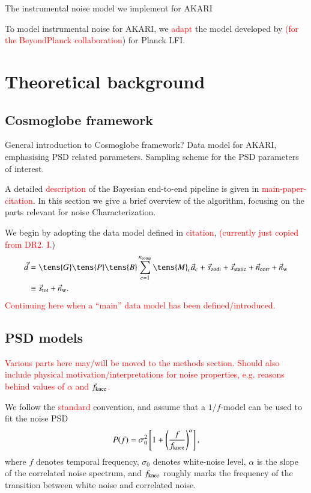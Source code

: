 \documentclass{aa}
\newcommand{\dv}[0]{\vec{d}}
\newcommand{\B}[0]{\tens{B}}
\newcommand{\G}[0]{\tens{G}}
\newcommand{\n}[0]{\vec{n}}
\newcommand{\s}[0]{\vec{s}}
\renewcommand{\a}[0]{\vec{a}}
\newcommand{\M}[0]{\tens{M}}
\renewcommand{\P}[0]{\tens{P}}
\renewcommand{\note}[1]{\textcolor{red}{#1}}
\newcommand{\pnote}[1]{\textcolor{red}{(#1})}
\newcommand{\pclosed}[1]{\left(#1\right)}
\newcommand{\bclosed}[1]{\left[#1\right]}
\begin{document}
The instrumental noise model we implement for AKARI

To model instrumental noise for AKARI, we \note{adapt} the model developed by \cite{ihleBEYONDPLANCKVINoise2023} \pnote{for the BeyondPlanck collaboration} for Planck LFI. 



\section{Theoretical background}
\label{sec:theoretical_background}

\subsection{Cosmoglobe framework}
\label{sec:cosmoglobe_framework}
General introduction to Cosmoglobe framework? Data model for AKARI, emphasising PSD related parameters. Sampling scheme for the PSD parameters of interest.

A detailed \note{description} of the Bayesian end-to-end pipeline is given in \note{main-paper-citation}. In this section we give a brief overview of the algorithm, focusing on the parts relevant for noise Characterization.

We begin by adopting the data model defined in \note{citation}, \pnote{currently just copied from DR2. I.}
\begin{align}
	\label{eq:model}
	\dv &=\G\P\B\sum_{c=1}^{n_{\mathrm{comp}}}\M_c\a_c+\s_{\mathrm{zodi}} +
          \s_{\mathrm{static}} + \n_\mathrm{corr} + \n_\mathrm w\\
        &\equiv \s_{\mathrm{tot}} + \n_{\mathrm{w}}.
\end{align}
\note{Continuing here when a ``main'' data model has been defined/introduced.}

\subsection{PSD models}
\label{sec:PSD_models}
\note{Various parts here may/will be moved to the methods section. Should also include physical motivation/interpretations for noise properties, e.g. reasons behind values of $\alpha$ and $\fknee$.}

We follow the \note{standard} convention, and assume that a $1/f$-model can be used to fit the noise PSD
\begin{equation}
    \label{eq:psd_oof_model}
    P(f) = \sigma_0^2 \bclosed{1 + \pclosed{\frac{f}{\fknee}}^\alpha},
\end{equation}
where $f$ denotes temporal frequency, $\sigma_0$ denotes white-noise level, $\alpha$ is the slope of the correlated noise spectrum, and $\fknee$ roughly marks the frequency of the transition between white noise and correlated noise.  
\end{document}
